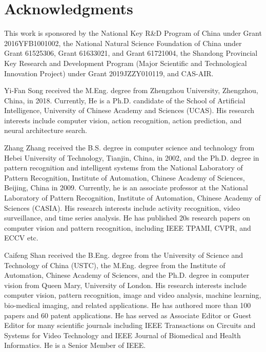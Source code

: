 \documentclass[10pt,journal,compsoc]{IEEEtran}
\begin{document}
\section*{Acknowledgments}

This work is sponsored by the National Key R\&D Program of China under Grant 2016YFB1001002, the National Natural Science Foundation of China under Grant 61525306, Grant 61633021, and Grant 61721004, the Shandong Provincial Key Research and Development Program (Major Scientific and Technological Innovation Project) under Grant 2019JZZY010119, and CAS-AIR.

{\small
  
  
}

\begin{IEEEbiography}{Yi-Fan Song}
received the M.Eng. degree from Zhengzhou University, Zhengzhou, China, in 2018. Currently, He is a Ph.D. candidate of the School of Artificial Intelligence, University of Chinese Academy and Sciences (UCAS). His research interests include computer vision, action recognition, action prediction, and neural architecture search.
\end{IEEEbiography}

\begin{IEEEbiography}{Zhang Zhang}
received the B.S. degree in computer science and technology from Hebei University of Technology, Tianjin, China, in 2002, and the Ph.D. degree in pattern recognition and intelligent systems from the National Laboratory of Pattern Recognition, Institute of Automation, Chinese Academy of Sciences, Beijing, China in 2009. Currently, he is an associate professor at the National Laboratory of Pattern Recognition, Institute of Automation, Chinese Academy of Sciences (CASIA). His research interests include activity recognition, video surveillance, and time series analysis. He has published 20s research papers on computer vision and pattern recognition, including IEEE TPAMI, CVPR, and ECCV etc.
\end{IEEEbiography}

\begin{IEEEbiography}{Caifeng Shan}
received the B.Eng. degree from the University of Science and Technology of China (USTC), the M.Eng. degree from the Institute of Automation, Chinese Academy of Sciences, and the Ph.D. degree in computer vision from Queen Mary, University of London. His research interests include computer vision, pattern recognition, image and video analysis, machine learning, bio-medical imaging, and related applications. He has authored more than 100 papers and 60 patent applications. He has served as Associate Editor or Guest Editor for many scientific journals including IEEE Transactions on Circuits and Systems for Video Technology and IEEE Journal of Biomedical and Health Informatics. He is a Senior Member of IEEE.
\end{IEEEbiography}
\end{document}
